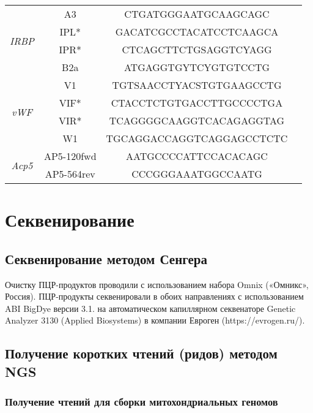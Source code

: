 \begin{table}[h!]
\begin{center}
\begin{tabular}{|c|c|c|c|}
\multirow{4}{*}{\textit{IRBP}}	& A3  & CTGATGGGAATGCAAGCAGC & \multirow{4}{*}{\cite{Petrova2016}}\\ 
\cline{2-3} 
& IPL* & GACATCGCCTACATCCTCAAGCA & \\ \cline{2-3} 
& IPR* & CTCAGCTTCTGSAGGTCYAGG & \\ \cline{2-3} 
& B2a & ATGAGGTGYTCYGTGTCCTG & \\
\hline

\multirow{4}{*}{\textit{vWF}}	& V1 & TGTSAACCTYACSTGTGAAGCCTG & \multirow{4}{*}{\cite{Poux2006}}\\ 
\cline{2-3} 
& VIF* & CTACCTCTGTGACCTTGCCCCTGA & \\ \cline{2-3} 
& VIR* & TCAGGGGCAAGGTCACAGAGGTAG & \\ \cline{2-3} 
& W1 & TGCAGGACCAGGTCAGGAGCCTCTC & \\
\hline

\multirow{2}{*}{\textit{Acp5}}	& AP5-120fwd  & AATGCCCCATTCCACACAGC & \multirow{2}{*}{\cite{Steppan2017}}\\ 
\cline{2-3} 
& AP5-564rev & CCCGGGAAATGGCCAATG & \\ 
\hline

\end{tabular} 

\end{center}

\end{table}

\section{Секвенирование}

\subsection{Секвенирование методом Сенгера}

Очистку ПЦР-продуктов проводили с использованием набора Omnix («Омникс», Россия). ПЦР-продукты секвенировали в обоих направлениях с использованием ABI BigDye версии 3.1. на автоматическом капиллярном секвенаторе Genetic Analyzer 3130 (Applied Biosystems) в компании Евроген (https://evrogen.ru/).  

\subsection{Получение коротких чтений (ридов) методом NGS}

\subsubsection{Получение чтений для сборки митохондриальных геномов}

